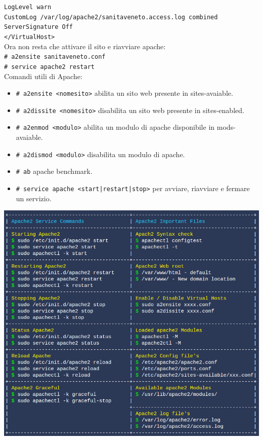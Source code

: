 \documentclass[a4paper]{report}
\newcommand\tab[1][1cm]{\hspace*{#1}}
\begin{document}
\tab\tab\texttt{LogLevel warn}\\
\tab\tab\texttt{CustomLog /var/log/apache2/sanitaveneto.access.log combined}\\
\tab\tab\texttt{ServerSignature Off}\\
\tab\texttt{</VirtualHost>}\\
Ora non resta che attivare il sito e riavviare apache:\\
\tab\texttt{\# a2ensite sanitaveneto.conf}\\
\tab\texttt{\# service apache2 restart}\\
Comandi utili di Apache:
\begin{itemize}
\item \texttt{\# a2ensite <nomesito>} abilita un sito web presente
in sites-avaiable.
\item \texttt{\# a2dissite <nomesito>} disabilita un sito web
presente in sites-enabled.
\item \texttt{\# a2enmod <modulo>} abilita un modulo di apache
disponibile in mods-avaiable.
\item \texttt{\# a2dismod <modulo>} disabilita un modulo di apache.
\item \texttt{\# ab} apache benchmark.
\item \texttt{\# service apache <start|restart|stop>} per avviare, riavviare e fermare un servizio.
\end{itemize}
\begin{center}
\includegraphics[scale=0.6]{comandiapache.png}
\end{center}
\end{document}
